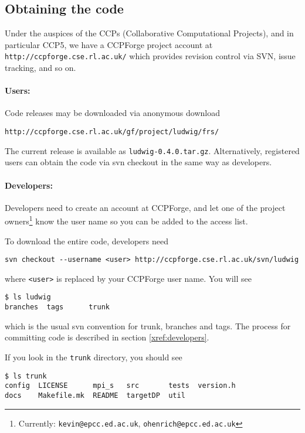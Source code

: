 \subsection{Obtaining the code}

Under the auspices of the CCPs (Collaborative Computational Projects),
and in particular CCP5, we have a CCPForge project account at
\texttt{http://ccpforge.cse.rl.ac.uk/}
which provides revision control via SVN, issue tracking, and so on.

\paragraph{Users:}

Code releases may be downloaded via anonymous download
\begin{lstlisting}[style=terminalverbatim]
http://ccpforge.cse.rl.ac.uk/gf/project/ludwig/frs/
\end{lstlisting}
The current release is available as \texttt{ludwig-0.4.0.tar.gz}.
Alternatively, registered users can obtain the code via svn checkout
in the same way as developers.


\paragraph{Developers:}

Developers need to create an account at CCPForge, and let one of the
project owners\footnote{Currently: \texttt{kevin@epcc.ed.ac.uk},
\texttt{ohenrich@epcc.ed.ac.uk}}
know the user name so you can be added to the access list.

To download the entire code, developers need
\begin{lstlisting}
svn checkout --username <user> http://ccpforge.cse.rl.ac.uk/svn/ludwig
\end{lstlisting}
where \texttt{<user>} is replaced by your CCPForge user name. You will
see
\begin{lstlisting}
$ ls ludwig
branches  tags      trunk
\end{lstlisting}
which is the usual svn convention for trunk, branches and tags.
The process for committing code is described in section \ref{xref:developers}.

If you look in  the \texttt{trunk} directory, you should see
\begin{lstlisting}
$ ls trunk
config  LICENSE      mpi_s   src       tests  version.h
docs    Makefile.mk  README  targetDP  util
\end{lstlisting}

